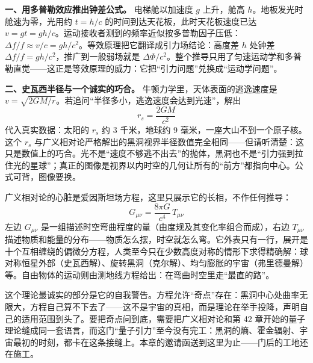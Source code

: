 \begin{mathbridge}
\textbf{一、用多普勒效应推出钟差公式。} 电梯舱以加速度 \(g\) 上升，舱高 \(h\)。地板发光时舱速为零，光用约 \(t=h/c\) 的时间到达天花板，此时天花板速度已达 \(v=gt=gh/c\)。运动接收者测到的频率近似按多普勒因子压低：\(\Delta f/f\approx v/c=gh/c^{2}\)。等效原理把它翻译成引力场结论：高度差 \(h\) 处钟差 \(\Delta f/f=gh/c^{2}\)，推广到一般弱场就是 \(\Delta\Phi/c^{2}\)。整个推导只用了匀速运动学和多普勒直觉——这正是等效原理的威力：它把“引力问题”兑换成“运动学问题”。

\textbf{二、史瓦西半径与一个诚实的巧合。} 牛顿力学里，天体表面的逃逸速度是 \(v=\sqrt{2GM/r}\)。若追问“半径多小，逃逸速度会达到光速”，解出
\[
r_{s}=\frac{2GM}{c^{2}}
\]
代入真实数据：太阳的 \(r_{s}\) 约 3 千米，地球约 9 毫米，一座大山不到一个原子核。这个 \(r_{s}\) 与广义相对论严格解出的黑洞视界半径数值完全相同——但请听清楚：这只是数值上的巧合。光不是“速度不够逃不出去”的抛体，黑洞也不是“引力强到拉住光的星球”；真正的图像是视界以内时空的几何让所有的“前方”都指向中心。公式可背，图像要换。
\end{mathbridge}

\begin{challenge}
广义相对论的心脏是爱因斯坦场方程，这里只展示它的长相，不作任何推导：
\[
G_{\mu\nu}=\frac{8\pi G}{c^{4}}\,T_{\mu\nu}
\]
左边 \(G_{\mu\nu}\) 是一组描述时空弯曲程度的量（由度规及其变化率组合而成），右边 \(T_{\mu\nu}\) 描述物质和能量的分布——物质怎么摆，时空就怎么弯。它外表只有一行，展开是十个互相缠绕的偏微分方程，人类至今只在少数高度对称的情形下求得精确解：球对称恒星外部（史瓦西解）、旋转黑洞（克尔解）、均匀膨胀的宇宙（弗里德曼解）等。自由物体的运动则由测地线方程给出：在弯曲时空里走“最直的路”。

这个理论最诚实的部分是它的自我警告。方程允许“奇点”存在：黑洞中心处曲率无限大，方程自己算不下去了——这不是宇宙的真相，而是理论在举手投降，声明自己的适用范围到头了。要把奇点问到底，需要把广义相对论和第 42 章开始的量子理论缝成同一套语言，而这门“量子引力”至今没有完工：黑洞的熵、霍金辐射、宇宙最初的时刻，都卡在这条接缝上。本章的邀请函送到这里为止——门后的工地还在施工。
\end{challenge}


